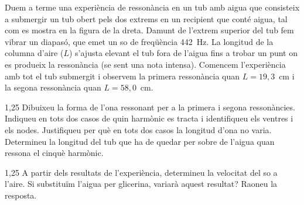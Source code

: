 Duem a terme una experiència de ressonància en un tub amb aigua que consisteix a submergir un tub obert pels dos extrems en un recipient que conté aigua, tal com es mostra en la figura de la dreta. Damunt de l'extrem superior del tub fem vibrar un diapasó, que emet un so de freqüència 442~Hz. La longitud de la columna d'aire ($L$) s'ajusta elevant el tub fora de l'aigua fins a trobar un punt on es produeix la ressonància (se sent una nota intensa). Comencem l'experiència amb tot el tub submergit i observem la primera ressonància quan $L = 19,3$~cm i la segona ressonància quan $L = 58,0$~cm.


\begin{apartat}{1,25}
Dibuixeu la forma de l'ona ressonant per a la primera i segona ressonàncies. Indiqueu en tots dos casos de quin harmònic es tracta i identifiqueu els ventres i els nodes. Justifiqueu per què en tots dos casos la longitud d'ona no varia. Determineu la longitud del tub que ha de quedar per sobre de l'aigua quan ressona el cinquè harmònic.
\end{apartat}

\begin{apartat}{1,25}
A partir dels resultats de l'experiència, determineu la velocitat del so a l'aire. Si substituïm l'aigua per glicerina, variarà aquest resultat? Raoneu la resposta.
\end{apartat}

